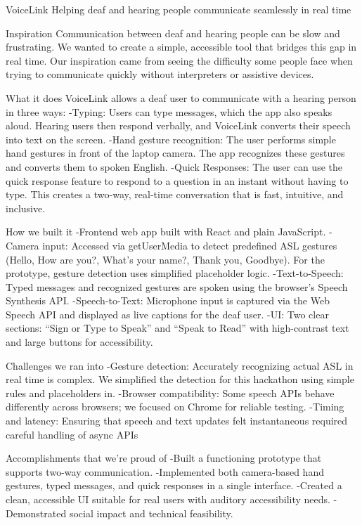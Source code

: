 VoiceLink
Helping deaf and hearing people communicate seamlessly in real time

Inspiration
Communication between deaf and hearing people can be slow and frustrating. We wanted to create a simple, accessible tool that bridges this gap in real time. Our inspiration came from seeing the difficulty some people face when trying to communicate quickly without interpreters or assistive devices.

What it does
VoiceLink allows a deaf user to communicate with a hearing person in three ways: -Typing: Users can type messages, which the app also speaks aloud. Hearing users then respond verbally, and VoiceLink converts their speech into text on the screen. -Hand gesture recognition: The user performs simple hand gestures in front of the laptop camera. The app recognizes these gestures and converts them to spoken English. -Quick Responses: The user can use the quick response feature to respond to a question in an instant without having to type. This creates a two-way, real-time conversation that is fast, intuitive, and inclusive.

How we built it
-Frontend web app built with React and plain JavaScript. -Camera input: Accessed via getUserMedia to detect predefined ASL gestures (Hello, How are you?, What’s your name?, Thank you, Goodbye). For the prototype, gesture detection uses simplified placeholder logic. -Text-to-Speech: Typed messages and recognized gestures are spoken using the browser’s Speech Synthesis API. -Speech-to-Text: Microphone input is captured via the Web Speech API and displayed as live captions for the deaf user. -UI: Two clear sections: “Sign or Type to Speak” and “Speak to Read” with high-contrast text and large buttons for accessibility.

Challenges we ran into
-Gesture detection: Accurately recognizing actual ASL in real time is complex. We simplified the detection for this hackathon using simple rules and placeholders in. -Browser compatibility: Some speech APIs behave differently across browsers; we focused on Chrome for reliable testing. -Timing and latency: Ensuring that speech and text updates felt instantaneous required careful handling of async APIs

Accomplishments that we're proud of
-Built a functioning prototype that supports two-way communication. -Implemented both camera-based hand gestures, typed messages, and quick responses in a single interface. -Created a clean, accessible UI suitable for real users with auditory accessibility needs. -Demonstrated social impact and technical feasibility.

